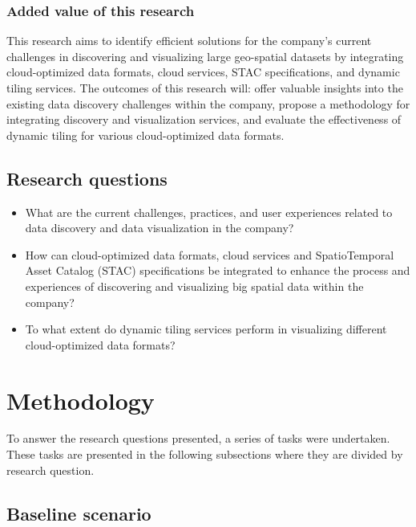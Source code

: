 \documentclass[
  oneside,
  open=any]{scrbook}
\providecommand{\tightlist}{%
  \setlength{\itemsep}{0pt}\setlength{\parskip}{0pt}}\usepackage{longtable,booktabs,array}
\begin{document}
\subsection{Added value of this
research}\label{added-value-of-this-research}

This research aims to identify efficient solutions for the company's
current challenges in discovering and visualizing large geo-spatial
datasets by integrating cloud-optimized data formats, cloud services,
STAC specifications, and dynamic tiling services. The outcomes of this
research will: offer valuable insights into the existing data discovery
challenges within the company, propose a methodology for integrating
discovery and visualization services, and evaluate the effectiveness of
dynamic tiling for various cloud-optimized data formats.

\section{Research questions}\label{research-questions}

\begin{itemize}
\tightlist
\item
  What are the current challenges, practices, and user experiences
  related to data discovery and data visualization in the company?
\item
  How can cloud-optimized data formats, cloud services and
  SpatioTemporal Asset Catalog (STAC) specifications be integrated to
  enhance the process and experiences of discovering and visualizing big
  spatial data within the company?
\item
  To what extent do dynamic tiling services perform in visualizing
  different cloud-optimized data formats?
\end{itemize}

\chapter{Methodology}\label{methodology}

To answer the research questions presented, a series of tasks were
undertaken. These tasks are presented in the following subsections where
they are divided by research question.

\section{Baseline scenario}\label{sec-baseline}
\end{document}
